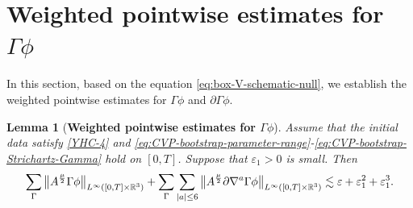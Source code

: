 \documentclass[11pt,twoside]{article}
\def\R{\mathop{\mathbb R\kern 0pt}\nolimits}
\def\p{\partial}
\def\ve{\varepsilon}
\def\ls{\lesssim}
\theoremstyle{plain}
\newtheorem{lemma}[theorem]{Lemma}
\theoremstyle{definition}
\theoremstyle{assumption}
\numberwithin{equation}{section}
\begin{document}
	
	
	
	\section{Weighted pointwise estimates for $\Gamma\phi$}
	\label{sec:weighted-pointwise-estimates-II}
	
	In this section, based on the equation \eqref{eq:box-V-schematic-null}, we establish the weighted pointwise estimates for $\Gamma\phi$
	and $\p\Gamma\phi$.
	
	
	\begin{lemma}[{\bf Weighted pointwise estimates  for $\Gamma\phi$}]
		\label{lem:CVP-weighted-pointwise-Gamma-closure}
		Assume that the initial data satisfy \eqref{YHC-4} and
		\eqref{eq:CVP-bootstrap-parameter-range}-\eqref{eq:CVP-bootstrap-Strichartz-Gamma}
		hold on \([0,T]\). Suppose that \(\ve_1>0\) is small. Then
		\begin{equation}
			\label{eq:CVP-weighted-Gamma-conclusion}
			\begin{aligned}
				\sum_{\Gamma}
				\big\|
				A^{\frac{\mu}{2}}
				\Gamma\phi
				\big\|_{L^\infty([0,T]\times\R^3)}
				+
				\sum_{\Gamma}
				\sum_{|a|\le 6}
				\big\|
				A^{\frac{\mu}{2}}
				\p\nabla^a\Gamma\phi
				\big\|_{L^\infty([0,T]\times\R^3)}
				\ls
				\ve+\ve_1^2+\ve_1^3.
			\end{aligned}
		\end{equation}
		\end{lemma}
	
\end{document}
